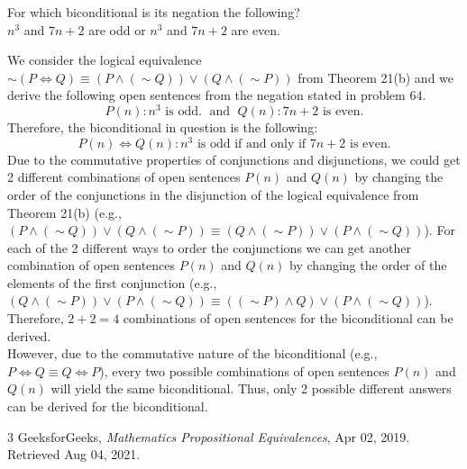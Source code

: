 \documentclass[12pt]{article}
\newenvironment{problem}[2][Problem]{\begin{trivlist}
		\item[\hskip \labelsep {\bfseries #1}\hskip \labelsep {\bfseries #2.}]}{\end{trivlist}}
\newenvironment{solution}[2][Solution]{\begin{trivlist}
		\item[\hskip \labelsep {\bfseries #1}\hskip \labelsep {\bfseries #2.}]}{\end{trivlist}}
\begin{document}
\begin{problem}{64}
	For which biconditional is its negation the following?\\
	$n^{3}$ and $7n + 2$ are odd or $n^{3}$ and $7n + 2$ are even.
	\begin{solution}{}
		We consider the logical equivalence $\sim (P \Leftrightarrow Q) \equiv (P \wedge (\sim Q)) \vee (Q \wedge (\sim P))$ from Theorem 21(b) and we derive the following open sentences from the negation stated in problem 64.
			\begin{equation*}
			P(n):n^{3} \text{ is odd.}\; \text{ and }\; Q(n):7n+2 \text{ is even.}
		\end{equation*}
	Therefore, the biconditional in question is the following:
	\begin{equation*}
		P(n)\Leftrightarrow Q(n): n^{3} \text{ is odd if and only if } 7n + 2 \text{ is even.}
	\end{equation*}
	Due to the commutative properties of conjunctions and disjunctions, we could get 2 different combinations of open sentences $P(n)$ and $Q(n)$ by changing the order of the conjunctions in the disjunction of the logical equivalence from Theorem 21(b) (e.g., $(P\wedge(\sim Q))\vee(Q\wedge (\sim P)) \equiv (Q\wedge (\sim P)) \vee (P\wedge(\sim Q))$). For each of the 2 different ways to order the conjunctions we can get another combination of open sentences $P(n)$ and $Q(n)$ by changing the order of the elements of the first conjunction (e.g., $(Q\wedge (\sim P)) \vee (P\wedge(\sim Q)) \equiv ((\sim P)\wedge Q) \vee (P\wedge(\sim Q))$). Therefore, $2+ 2= 4$ combinations of open sentences for the biconditional can be derived. \\
	However, due to the commutative nature of the biconditional (e.g., $P\Leftrightarrow Q \equiv Q \Leftrightarrow P$), every two possible combinations of open sentences $P(n)$ and $Q(n)$ will yield the same biconditional. Thus, only 2 possible different answers can be derived for the biconditional.
	\end{solution}
\end{problem}
\begin{thebibliography}{3}
	GeeksforGeeks, \textit{Mathematics Propositional Equivalences}, Apr 02, 2019. Retrieved Aug 04, 2021.
\end{thebibliography}
\end{document}
